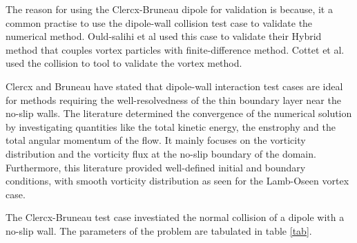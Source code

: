 The reason for using the Clercx-Bruneau dipole for validation is because, it a common practise to use the dipole-wall collision test case to validate the numerical method. Ould-salihi et al \cite{} used this case to validate their Hybrid method that couples vortex particles with finite-difference method. Cottet et al. \cite{} used the collision to tool to validate the vortex method.

Clercx and Bruneau have stated that dipole-wall interaction test cases are ideal for methods requiring the well-resolvedness of the thin boundary layer near the no-slip walls. The literature determined the convergence of the numerical solution by investigating quantities like the total kinetic energy, the enstrophy and the total angular momentum of the flow. It mainly focuses on the vorticity distribution and the vorticity flux at the no-slip boundary of the domain. Furthermore, this literature provided well-defined initial and boundary conditions, with smooth vorticity distribution as seen for the Lamb-Oseen vortex case.

The Clercx-Bruneau test case investiated the normal collision of a dipole with a no-slip wall. The parameters of the problem are tabulated in table \ref{tab}. 

